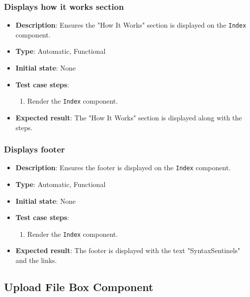 \documentclass[12pt, titlepage]{article}
\begin{document}
\subsubsection{Displays how it works section}
\begin{itemize}
    \item \textbf{Description}: Ensures the "How It Works" section is displayed on the \texttt{Index} component.
    \item \textbf{Type}: Automatic, Functional
    \item \textbf{Initial state}: None
    \item \textbf{Test case steps}:
    \begin{enumerate}
        \item Render the \texttt{Index} component.
    \end{enumerate}
    \item \textbf{Expected result}: The "How It Works" section is displayed along with the steps.
\end{itemize}

\subsubsection{Displays footer}
\begin{itemize}
    \item \textbf{Description}: Ensures the footer is displayed on the \texttt{Index} component.
    \item \textbf{Type}: Automatic, Functional
    \item \textbf{Initial state}: None
    \item \textbf{Test case steps}:
    \begin{enumerate}
        \item Render the \texttt{Index} component.
    \end{enumerate}
    \item \textbf{Expected result}: The footer is displayed with the text "SyntaxSentinels" and the links.

\end{itemize}

\subsection{Upload File Box Component}
\end{document}
